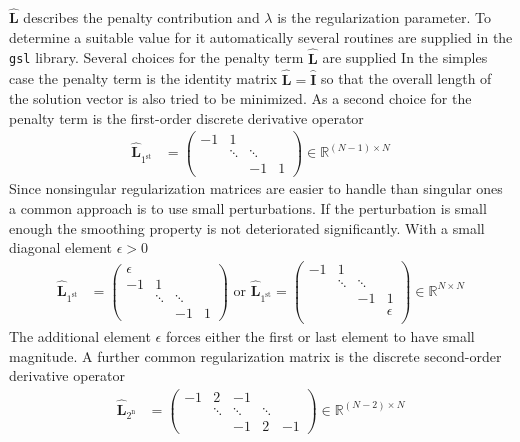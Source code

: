 $\hat{\mathbf{L}}$ describes the penalty contribution and $\lambda$
 is the regularization parameter. To determine a suitable value for it automatically several routines are supplied in the \texttt{gsl} library. Several choices for the penalty term $\hat{\mathbf{L}}$ are supplied
 In the simples case the penalty term is the identity matrix $\hat{\mathbf{L}} = \hat{\mathbf{I}}$ so that the overall length of the solution vector is also tried to be minimized. As a second choice for the penalty term is the first-order discrete derivative operator \cite{Donatelli2014}
 \begin{align}\label{eq:first_derivative_penalty}
   \hat{\mathbf{L}}_\mathrm{1^{st}} &=
  \begin{pmatrix}
    -1    & 1      &        &  \\
          & \ddots & \ddots &  \\
          &        & -1     & 1
  \end{pmatrix} \in \mathbb{R}^{(N-1)\times N}
\end{align}
Since nonsingular regularization matrices are easier to handle than singular
ones a common approach is to use small perturbations.
If the perturbation is small enough the smoothing property is not deteriorated
significantly. With a small diagonal element $\epsilon > 0$
\begin{align}\label{eq:first_derivative_penalty_plus_epsilon}
   \hat{\mathbf{L}}_\mathrm{1^{st}} &=
  \begin{pmatrix}
  \epsilon & & & \\
    -1    & 1      &        &  \\
          & \ddots & \ddots &  \\
          &        & -1     & 1
  \end{pmatrix} \mbox{ or }  \hat{\mathbf{L}}_\mathrm{1^{st}}  =
  \begin{pmatrix}
    -1    & 1      &        &  \\
          & \ddots & \ddots &  \\
          &        & -1     & 1 \\
          & & & \epsilon \\
  \end{pmatrix} \in \mathbb{R}^{N\times N}
\end{align}
The additional element $\epsilon$ forces either the
first or last element to have small magnitude.
A further common regularization matrix is the discrete second-order derivative \cite{Donatelli2014}
operator
 \begin{align}\label{eq:second_derivative_penalty}
   \hat{\mathbf{L}}_\mathrm{2^{n}} &=
  \begin{pmatrix}
    -1    &  2     & -1     &        &  \\
          & \ddots & \ddots & \ddots &  \\
          &        & -1     & 2      & -1
  \end{pmatrix} \in \mathbb{R}^{(N-2)\times N}
\end{align}
